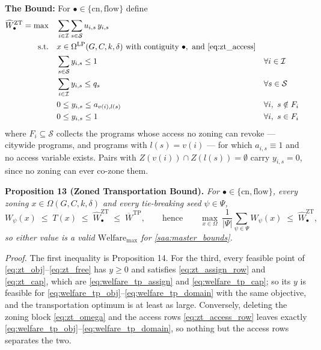 \documentclass{article}
\begin{document}
\noindent\textbf{The Bound:}
For $\bullet \in \{\mathrm{cn}, \mathrm{flow}\}$ define
\begin{align}
\widehat{W}^{\mathrm{ZT}}_{\bullet} = \max \quad & \sum_{i \in \mathcal{I}} \sum_{s \in \mathcal{S}} u_{i,s}\, y_{i,s} \label{eq:zt_obj} \\
\textrm{s.t.} \quad & x \in \Omega^{\mathrm{LP}}(G, C, k, \delta) \ \text{with contiguity } \bullet, \ \text{and } \eqref{eq:zt_access} \label{eq:zt_omega} \\
& \sum_{s \in \mathcal{S}} y_{i,s} \leq 1 && \forall i \in \mathcal{I} \label{eq:zt_assign_row} \\
& \sum_{i \in \mathcal{I}} y_{i,s} \leq q_s && \forall s \in \mathcal{S} \label{eq:zt_cap} \\
& 0 \leq y_{i,s} \leq a_{v(i), l(s)} && \forall i, \ s \notin F_i \label{eq:zt_access_row} \\
& 0 \leq y_{i,s} \leq 1 && \forall i, \ s \in F_i \label{eq:zt_free}
\end{align}
where $F_i \subseteq \mathcal{S}$ collects the programs whose access no zoning can revoke --- citywide programs, and programs with $l(s) = v(i)$ --- for which $a_{i,s} \equiv 1$ and no access variable exists. Pairs with $Z(v(i)) \cap Z(l(s)) = \emptyset$ carry $y_{i,s} = 0$, since no zoning can ever co-zone them.

\noindent\textbf{Proposition 13 (Zoned Transportation Bound).} \textit{For $\bullet \in \{\mathrm{cn}, \mathrm{flow}\}$, every zoning $x \in \Omega(G, C, k, \delta)$ and every tie-breaking seed $\psi \in \Psi$,}
\begin{equation}\label{eq:zt_chain}
W_\psi(x) \;\leq\; T(x) \;\leq\; \widehat{W}^{\mathrm{ZT}}_{\bullet} \;\leq\; \overline{W}^{\mathrm{TP}} ,
\qquad\text{hence}\qquad
\max_{x \in \Omega} \ \frac{1}{|\Psi|} \sum_{\psi \in \Psi} W_\psi(x) \;\leq\; \widehat{W}^{\mathrm{ZT}}_{\bullet} ,
\end{equation}
\textit{so either value is a valid $\text{Welfare}_{\max}$ for \eqref{saa:master_bounds}.}

\textit{Proof.} The first inequality is Proposition 14. For the third, every feasible point of \eqref{eq:zt_obj}--\eqref{eq:zt_free} has $y \geq 0$ and satisfies \eqref{eq:zt_assign_row} and \eqref{eq:zt_cap}, which are \eqref{eq:welfare_tp_assign} and \eqref{eq:welfare_tp_cap}; so its $y$ is feasible for \eqref{eq:welfare_tp_obj}--\eqref{eq:welfare_tp_domain} with the same objective, and the transportation optimum is at least as large. Conversely, deleting the zoning block \eqref{eq:zt_omega} and the access rows \eqref{eq:zt_access_row} leaves exactly \eqref{eq:welfare_tp_obj}--\eqref{eq:welfare_tp_domain}, so nothing but the access rows separates the two.
\end{document}
